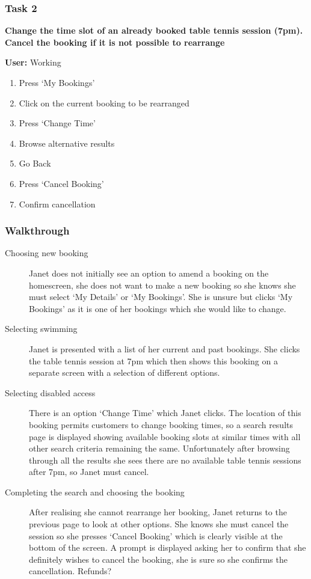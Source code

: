 \subsubsection{Task 2}
\label{ssub:task_2}

\textbf{Change the time slot of an already booked table tennis session (7pm).
Cancel the booking if it is not possible to rearrange}

\textbf{User:} Working
\begin{enumerate}
	\item Press `My Bookings'
	\item Click on the current booking to be rearranged
	\item Press `Change Time'
	\item Browse alternative results
	\item Go Back
	\item Press `Cancel Booking'
	\item Confirm cancellation
\end{enumerate}

\subsubsection{Walkthrough}

\begin{description}
	\item[Choosing new booking] Janet does not initially see an option to amend
		a booking on the homescreen, she does not want to make a new booking so
		she knows she must select `My Details' or `My Bookings'. She is unsure
		but clicks `My Bookings' as it is one of her bookings which she would
		like to change.

	\item[Selecting swimming] Janet is presented with a list of her current and
		past bookings. She clicks the table tennis session at 7pm which then
		shows this booking on a separate screen with a selection of different
		options.

	\item[Selecting disabled access] There is an option `Change Time' which
		Janet clicks. The location of this booking permits customers to change
		booking times, so a search results page is displayed showing available
		booking slots at similar times with all other search criteria remaining
		the same. Unfortunately after browsing through all the results she sees
		there are no available table tennis sessions after 7pm, so Janet must
		cancel.

	\item[Completing the search and choosing the booking] After realising she
		cannot rearrange her booking, Janet returns to the previous page to
		look at other options. She knows she must cancel the session so she
		presses `Cancel Booking' which is clearly visible at the bottom of the
		screen. A prompt is displayed asking her to confirm that she definitely
		wishes to cancel the booking, she is sure so she confirms the
		cancellation. Refunds?
\end{description}

